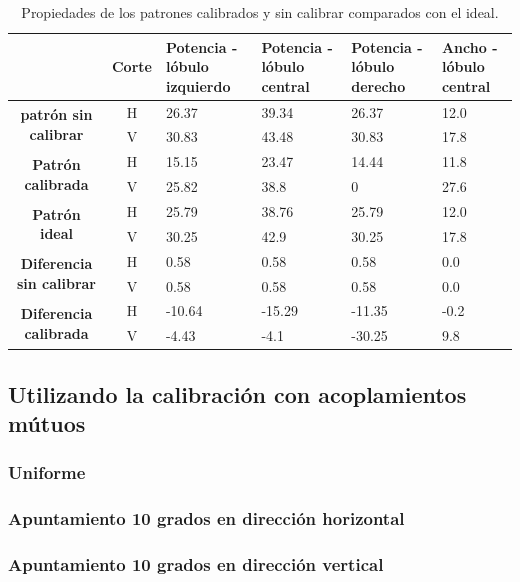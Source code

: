 \begin{table}[H]
  \footnotesize
  \centering
  \begin{tabular}{|c|c|p{2cm}|p{2cm}|p{2cm}|p{2cm}|}
    \cline{2-6}
    \multicolumn{1}{c|}{} & \textbf{Corte} & \textbf{Potencia - lóbulo izquierdo} & \textbf{Potencia - lóbulo central} &
    \textbf{Potencia - lóbulo derecho} & \textbf{Ancho - lóbulo central} \tabularnewline\hline
    \multirow{2}{*}{\textbf{patrón sin calibrar}} & H & 26.37 & 39.34 & 26.37 & 12.0 \tabularnewline\cline{2-6}
     & V & 30.83 & 43.48 & 30.83 & 17.8 \tabularnewline\hline
    \multirow{2}{*}{\textbf{Patrón calibrada}} & H & 15.15 & 23.47 & 14.44 & 11.8 \tabularnewline\cline{2-6}
     & V & 25.82 & 38.8 & 0 & 27.6 \tabularnewline\hline
    \multirow{2}{*}{\textbf{Patrón ideal}} & H & 25.79 & 38.76 & 25.79 & 12.0 \tabularnewline\cline{2-6}
     & V & 30.25 & 42.9 & 30.25 & 17.8 \tabularnewline\hline
    \multirow{2}{*}{\textbf{Diferencia sin calibrar}} & H & 0.58 & 0.58 & 0.58 & 0.0\tabularnewline\cline{2-6}
     & V & 0.58 & 0.58 & 0.58 & 0.0 \tabularnewline\hline
    \multirow{2}{*}{\textbf{Diferencia calibrada}} & H & -10.64 & -15.29 & -11.35 & -0.2 \tabularnewline\cline{2-6}
     & V & -4.43 & -4.1 & -30.25 & 9.8 \tabularnewline\hline
  \end{tabular}
  \caption{Propiedades de los patrones calibrados y sin calibrar comparados con el ideal.}
  \label{tab:chirpErrClassical10degRow}
\end{table}


\subsection{Utilizando la calibración con acoplamientos mútuos}

\subsubsection{Uniforme}

\subsubsection{Apuntamiento 10 grados en dirección horizontal}

\subsubsection{Apuntamiento 10 grados en dirección vertical}


